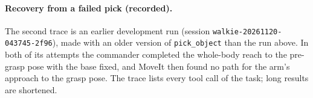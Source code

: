 \documentclass[12pt,a4paper]{article}
\begin{document}
\paragraph{Recovery from a failed pick (recorded).}
The second trace is an earlier development run (session \texttt{walkie-20261120-043745-2f96}), made
with an older version of \texttt{pick\_object} than the run above. In both of its attempts the
commander completed the whole-body reach to the pre-grasp pose with the base fixed, and MoveIt then
found no path for the arm's approach to the grasp pose. The trace lists every tool call of the task;
long results are shortened.
\end{document}
